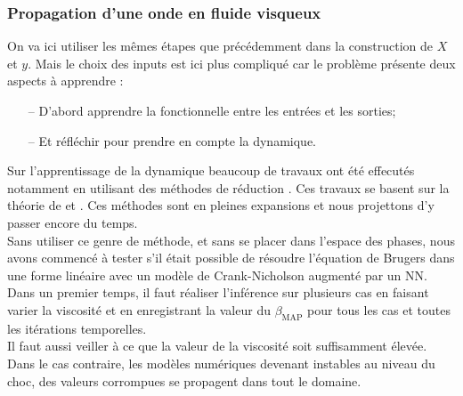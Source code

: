 \documentclass[a4paper,12pt]{article}
\newcommand{\bmap}{\beta_{\text{MAP}}}
\newcommand\bk{\color{black}}
\newcommand\dsb{\color{dsb}}
\numberwithin{equation}{section} %
\begin{document}
\dsb \subsubsection{Propagation d'une onde en fluide visqueux} \bk
\noindent On va ici utiliser les mêmes étapes que précédemment dans la construction de $X$ et $y$. Mais le choix des inputs est ici plus compliqué car le problème présente deux aspects à apprendre : 
\begin{itemize}[leftmargin=5mm]
\item[--] D'abord apprendre la fonctionnelle entre les entrées et les sorties;
\item[--] Et réfléchir pour prendre en compte la dynamique.
\end{itemize}   
Sur l'apprentissage de la dynamique beaucoup de travaux ont été effecutés notamment en utilisant des méthodes de réduction \citep{parish2016reduced}. Ces travaux se basent sur la théorie de \citep{chorin2002optimal} et \citep{tsung1995phase}. Ces méthodes sont en pleines expansions et nous projettons d'y passer encore du temps.\\

\noindent Sans utiliser ce genre de méthode, et sans se placer dans l'espace des phases, nous avons commencé à tester s'il était possible de résoudre l'équation de Brugers dans une forme linéaire avec un modèle de Crank-Nicholson augmenté par un NN.\\
Dans un premier temps, il faut réaliser l'inférence sur plusieurs cas en faisant varier la viscosité et en enregistrant la valeur du $\bmap$ pour tous les cas et toutes les itérations temporelles. \\
Il faut aussi veiller à ce que la valeur de la viscosité soit suffisamment élevée. Dans le cas contraire, les modèles numériques devenant instables au niveau du choc, des valeurs corrompues se propagent dans tout le domaine.\\
\end{document}

